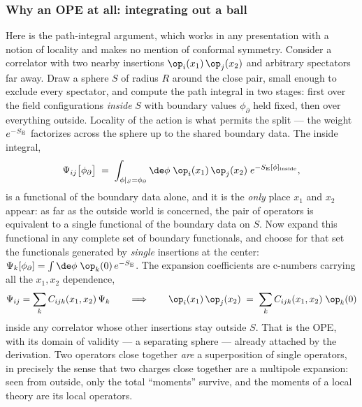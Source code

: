 \subsubsection{Why an OPE at all: integrating out a ball}
\label{sec:ope-ball}

Here is the path-integral argument, which works in any presentation with a
notion of locality and makes no mention of conformal symmetry. Consider a
correlator with two nearby insertions $\op_i(x_1)\,\op_j(x_2)$ and arbitrary
spectators far away. Draw a sphere $S$ of radius $R$ around the close pair,
small enough to exclude every spectator, and compute the path integral in two
stages: first over the field configurations \emph{inside} $S$ with boundary
values $\phi_\partial$ held fixed, then over everything outside. Locality of
the action is what permits the split --- the weight $e^{-S_{\rm E}}$
factorizes across the sphere up to the shared boundary data. The inside
integral,
\begin{equation}
\Psi_{ij}\big[\phi_\partial\big] \;=\;
\int_{\phi|_S = \phi_\partial} \de\phi\;
\op_i(x_1)\,\op_j(x_2)\; e^{-S_{\rm E}[\phi]_{\rm inside}},
\label{eq:ball-functional}
\end{equation}
is a functional of the boundary data alone, and it is the \emph{only} place
$x_1$ and $x_2$ appear: as far as the outside world is concerned, the pair
of operators is equivalent to a single functional of the boundary data on
$S$. Now expand this functional in any complete set of boundary functionals,
and choose for that set the functionals generated by \emph{single}
insertions at the center: $\Psi_k[\phi_\partial] = \int
\de\phi\;\op_k(0)\, e^{-S_{\rm E}}$. The expansion coefficients are
c-numbers carrying all the $x_1, x_2$ dependence,
\begin{equation}
\Psi_{ij} = \sum_k C_{ijk}(x_1, x_2)\, \Psi_k
\qquad\Longrightarrow\qquad
\op_i(x_1)\,\op_j(x_2) \;=\; \sum_k C_{ijk}(x_1, x_2)\;\op_k(0)
\label{eq:ball-ope}
\end{equation}
inside any correlator whose other insertions stay outside $S$. That is the
OPE, with its domain of validity --- a separating sphere --- already attached
by the derivation. Two operators close together \emph{are} a superposition of
single operators, in precisely the sense that two charges close together are
a multipole expansion: seen from outside, only the total ``moments'' survive,
and the moments of a local theory are its local operators.

